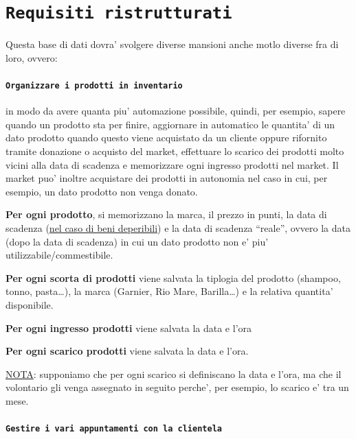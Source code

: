 \documentclass[]{article}
\date{}
\let\oldparagraph\paragraph
\renewcommand{\paragraph}[1]{\oldparagraph{#1}\mbox{}}
\begin{document}
\hypertarget{requisiti-ristrutturati}{%
\section{\texorpdfstring{\texttt{Requisiti\ ristrutturati}}{Requisiti ristrutturati}}\label{requisiti-ristrutturati}}

Questa base di dati dovra' svolgere diverse mansioni anche motlo diverse
fra di loro, ovvero:

\hypertarget{organizzare-i-prodotti-in-inventario}{%
\paragraph{\texorpdfstring{\texttt{Organizzare\ i\ prodotti\ in\ inventario}}{Organizzare i prodotti in inventario}}\label{organizzare-i-prodotti-in-inventario}}

in modo da avere quanta piu' automazione possibile, quindi, per esempio,
sapere quando un prodotto sta per finire, aggiornare in automatico le
quantita' di un dato prodotto quando questo viene acquistato da un
cliente oppure rifornito tramite donazione o acquisto del market,
effettuare lo scarico dei prodotti molto vicini alla data di scadenza e
memorizzare ogni ingresso prodotti nel market. Il market puo' inoltre
acquistare dei prodotti in autonomia nel caso in cui, per esempio, un
dato prodotto non venga donato.

\textbf{Per ogni prodotto}, si memorizzano la marca, il prezzo in punti,
la data di scadenza (\underline{nel caso di beni deperibili}) e la data
di scadenza ``reale'', ovvero la data (dopo la data di scadenza) in cui
un dato prodotto non e' piu' utilizzabile/commestibile.

\textbf{Per ogni scorta di prodotti} viene salvata la tiplogia del
prodotto (shampoo, tonno, pasta\ldots{}), la marca (Garnier, Rio Mare,
Barilla\ldots{}) e la relativa quantita' disponibile.

\textbf{Per ogni ingresso prodotti} viene salvata la data e l'ora

\textbf{Per ogni scarico prodotti} viene salvata la data e l'ora.

\underline{NOTA}: supponiamo che per ogni scarico si definiscano la data
e l'ora, ma che il volontario gli venga assegnato in seguito perche',
per esempio, lo scarico e' tra un mese.

\hypertarget{gestire-i-vari-appuntamenti-con-la-clientela}{%
\paragraph{\texorpdfstring{\texttt{Gestire\ i\ vari\ appuntamenti\ con\ la\ clientela}}{Gestire i vari appuntamenti con la clientela}}\label{gestire-i-vari-appuntamenti-con-la-clientela}}
\end{document}
